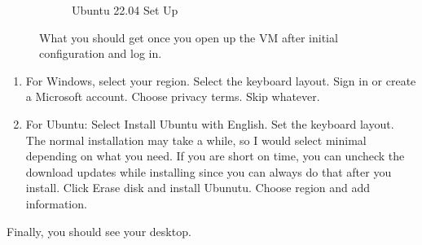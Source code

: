 \documentclass{article}
\begin{document}
\begin{figure}[hbt!]
\begin{subfigure}[b]{0.45\textwidth}
          \caption{Ubuntu 22.04 Set Up}
          \label{fig:VM_Ubuntu2}
      \end{subfigure}
      \caption{What you should get once you open up the VM after initial configuration and log in. }
  \end{figure}
  \begin{enumerate}
      \item For Windows, select your region. Select the keyboard layout. Sign in or create a Microsoft account. Choose privacy terms. Skip whatever. 
      \item For Ubuntu: Select Install Ubuntu with English. Set the keyboard layout. The normal installation may take a while, so I would select minimal depending on what you need. If you are short on time, you can uncheck the download updates while installing since you can always do that after you install. Click Erase disk and install Ubunutu. Choose region and add information. 
  \end{enumerate}
  Finally, you should see your desktop. 
\end{document}
